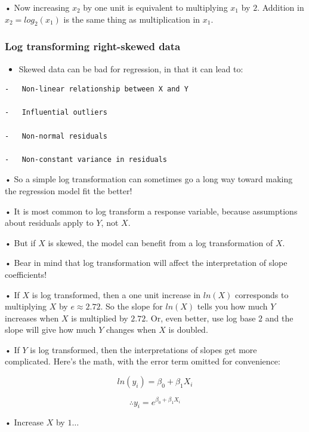 \documentclass[
  letterpaper,
  DIV=11,
  numbers=noendperiod]{scrreprt}
\providecommand{\tightlist}{%
  \setlength{\itemsep}{0pt}\setlength{\parskip}{0pt}}\usepackage{longtable,booktabs,array}
\begin{document}
• Now increasing \(x_2\) by one unit is equivalent to multiplying
\(x_1\) by \(2\). Addition in \(x_2 = log_2(x_1)\) is the same thing as
multiplication in \(x_1\).

\hypertarget{log-transforming-right-skewed-data}{%
\subsubsection{Log transforming right-skewed
data}\label{log-transforming-right-skewed-data}}

\begin{itemize}
\tightlist
\item
  Skewed data can be bad for regression, in that it can lead to:
\end{itemize}

\begin{verbatim}
-   Non-linear relationship between X and Y

-   Influential outliers

-   Non-normal residuals

-   Non-constant variance in residuals
\end{verbatim}

• So a simple log transformation can sometimes go a long way toward
making the regression model fit the better!

• It is most common to log transform a response variable, because
assumptions about residuals apply to \(Y\), not \(X\).

• But if \(X\) is skewed, the model can benefit from a log
transformation of \(X\).

• Bear in mind that log transformation will affect the interpretation of
slope coefficients!

• If \(X\) is log transformed, then a one unit increase in \(ln(𝑋)\)
corresponds to multiplying \(X\) by \(e \approx 2.72\). So the slope for
\(ln(𝑋)\) tells you how much \(Y\) increases when \(X\) is multiplied by
\(2.72\). Or, even better, use log base \(2\) and the slope will give
how much \(Y\) changes when \(X\) is doubled.

• If \(Y\) is log transformed, then the interpretations of slopes get
more complicated. Here's the math, with the error term omitted for
convenience:

\[
ln(y_i) = \beta_0 + \beta_1X_i
\]

\[
\therefore y_i = e^{\beta_0 + \beta_1X_i}
\]

• Increase \(X\) by \(1 \dots\)
\end{document}
